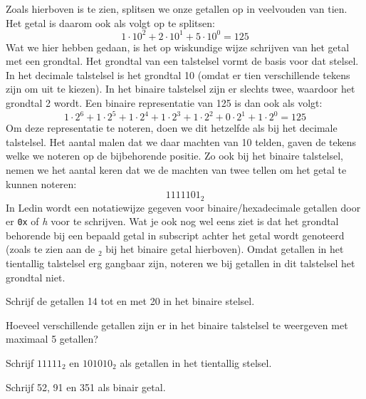Zoals hierboven is te zien, splitsen we onze getallen op in veelvouden van tien. Het getal is daarom ook als volgt op te splitsen:
\[
    1 \cdot 10^2 + 2 \cdot 10^1 + 5 \cdot 10^0 = 125
\]
Wat we hier hebben gedaan, is het op wiskundige wijze schrijven van het getal met een grondtal. Het grondtal van een talstelsel vormt de basis voor dat stelsel. In het decimale talstelsel is het grondtal 10 (omdat er tien verschillende tekens zijn om uit te kiezen). In het binaire talstelsel zijn er slechts twee, waardoor het grondtal 2 wordt. Een binaire representatie van 125 is dan ook als volgt:
\[
    1 \cdot 2^6 + 1 \cdot 2^5 + 1 \cdot 2^4 + 1 \cdot 2^3 + 1 \cdot 2^2 + 0 \cdot 2^1 + 1 \cdot 2^0 = 125
\]
Om deze representatie te noteren, doen we dit hetzelfde als bij het decimale talstelsel. Het aantal malen dat we daar machten van 10 telden, gaven de tekens welke we noteren op de bijbehorende positie. Zo ook bij het binaire talstelsel, nemen we het aantal keren dat we de machten van twee tellen om het getal te kunnen noteren:
\[
    1111101_2
\]
In Ledin wordt een notatiewijze gegeven voor binaire/hexadecimale getallen door er \texttt{0x} of \textit{h} voor te schrijven. Wat je ook nog wel eens ziet is dat  het grondtal behorende bij een bepaald getal in subscript achter het getal wordt genoteerd (zoals te zien aan de $_2$ bij het binaire getal hierboven). Omdat getallen in het tientallig talstelsel erg gangbaar zijn, noteren we bij getallen in dit talstelsel het grondtal niet.

\begin{opdracht}
Schrijf de getallen 14 tot en met 20 in het binaire stelsel.
\end{opdracht}

\begin{opdracht}
Hoeveel verschillende getallen zijn er in het binaire talstelsel te weergeven met maximaal 5 getallen?
\end{opdracht}

\begin{opdracht}
Schrijf $11111_2$ en $101010_2$ als getallen in het tientallig stelsel.
\end{opdracht}

\begin{opdracht}
Schrijf 52, 91 en 351 als binair getal.
\end{opdracht}

